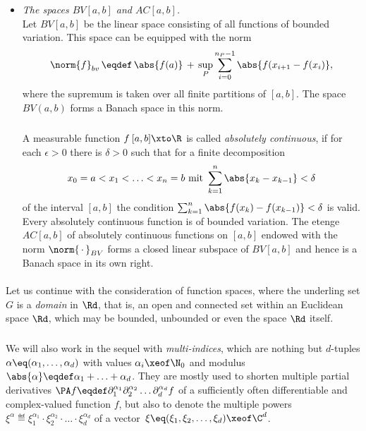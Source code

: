 \documentclass[11pt,twoside]{article}
\def\G{G}
\begin{document}
\begin{itemize}[leftmargin=12pt,itemsep=5pt]
\item[4.] \textit{The spaces $BV[a,b]$ and $AC[a,b]$.}\\
Let $BV[a,b]$ be the linear space consisting
of all functions of bounded variation.
This space can be equipped with the norm
\[
\norm{f}_{bv} \, \eqdef \,
\abs{ f(a) } \, + \,
\sup_{P} \sum_{i=0}^{n_P-1} \abs{f(x_{i+1}-f(x_i)} ,
\]
where the supremum is taken over all finite partitions of $[a,b]$.
The space $BV(a,b)$ forms a Banach space in this norm.

\subparagraph{} %
A measurable function $f\:[a,b] \xto \R$ is called 
\textit{absolutely continuous},
if for each $\epsilon > 0$ there is $\delta > 0$ 
such that for a finite decomposition
\[
x_0=a < x_1 < \ldots < x_n=b \mbox{ mit }
\sum_{k=1}^n \abs{x_k-x_{k-1}} < \delta
\]
of the interval $[a,b]$
the condition $\sum_{k=1}^n \abs{f(x_k)-f(x_{k-1})} < \delta$ is valid.
Every absolutely continuous function is of bounded variation.
The etenge $AC[a,b]$ of absolutely continuous functions on $[a,b]$
endowed with the norm $\norm{\,\cdot\,}_{BV}$
forms a closed linear subspace of $BV[a,b]$ and hence 
is a Banach space in its own right. 
\end{itemize}

\paragraph{} %
Let us continue with the consideration of function spaces,
where the underling set $\G$ is a \textit{domain} in $\Rd$,
that is,
an open and connected set within an Euclidean space $\Rd$,
which may be bounded, unbounded or even the space $\Rd$ itself.

\subparagraph{} %
We will also work in the sequel with \textit{multi-indices},
which are nothing but $d$-tuples
$\alpha \eq (\alpha_1,\ldots,\alpha_d)$
with values $\alpha_i \xeof \N_0$
and modulus $\abs{\alpha} \eqdef \alpha_1 + \ldots + \alpha_d$.
They are mostly used to shorten multiple partial derivatives
$
\PA f \eqdef \partial_1^{\alpha_1}
         \partial_2^{\alpha_2} \ldots
         \partial_d^{\alpha_d} f
$
of a sufficiently often differentiable and complex-valued function $f$,
but also to denote the multiple powers
$\xi^{\alpha} \eqdef \xi_1^{\alpha_1}
\cdot \xi_2^{\alpha_2} \cdot \ldots \cdot \xi_d^{\alpha_d}$
of a vector $\,\xi \eq (\xi_1,\xi_2,\ldots,\xi_d) \xeof \C^d$.
\end{document}
